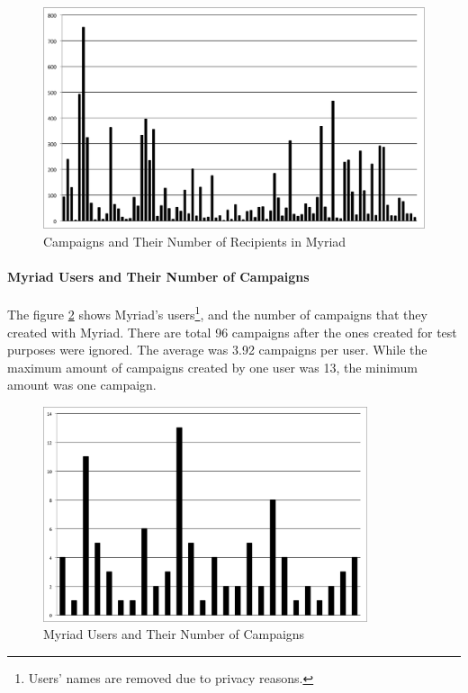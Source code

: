 \begin{figure}[htbp]
	\centering
	\includegraphics[width=1.00\textwidth]{imgs/ChartCampaignsRecipients.png}
	\caption[Campaigns and Their Number of Recipients in Myriad]{Campaigns and Their Number of Recipients in Myriad}
	\label{fig:ChartCampaignsRecipients}
\end{figure}

\paragraph{Myriad Users and Their Number of Campaigns} The figure \ref{fig:ChartUsersCampaigns} shows Myriad's users\footnote{Users' names are removed due to privacy reasons.}, and the number of campaigns that they created with Myriad. There are total 96 campaigns after the ones created for test purposes were ignored. The average was 3.92 campaigns per user. While the maximum amount of campaigns created by one user was 13, the minimum amount was one campaign.

\begin{figure}[htbp]
	\centering
	\includegraphics[width=0.85\textwidth]{imgs/ChartUsersCampaigns.png}
	\caption[Myriad Users and Their Number of Campaigns]{Myriad Users and Their Number of Campaigns}
	\label{fig:ChartUsersCampaigns}
\end{figure}

